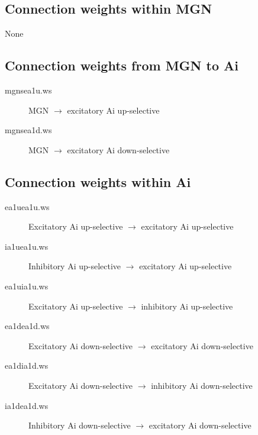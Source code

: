 \documentclass[12pt]{article}
\begin{document}
\subsection{Connection weights within MGN}
None

\subsection{Connection weights from MGN to Ai}
\begin{description}
 \item[mgnsea1u.ws] MGN $\rightarrow$ 
                     excitatory Ai up-selective
  \item[mgnsea1d.ws] MGN $\rightarrow$ 
                     excitatory Ai down-selective 
\end{description}

\subsection{Connection weights within Ai}
\begin{description}
  \item[ea1uea1u.ws] Excitatory Ai up-selective $\rightarrow$
                     excitatory Ai up-selective
  \item[ia1uea1u.ws] Inhibitory Ai up-selective $\rightarrow$
                     excitatory Ai up-selective
  \item[ea1uia1u.ws] Excitatory Ai up-selective $\rightarrow$
                     inhibitory Ai up-selective
  \item[ea1dea1d.ws] Excitatory Ai down-selective $\rightarrow$ 
                     excitatory Ai down-selective
  \item[ea1dia1d.ws] Excitatory Ai down-selective $\rightarrow$
                     inhibitory Ai down-selective
  \item[ia1dea1d.ws] Inhibitory Ai down-selective $\rightarrow$
                     excitatory Ai down-selective
\end{description}

\end{document}
